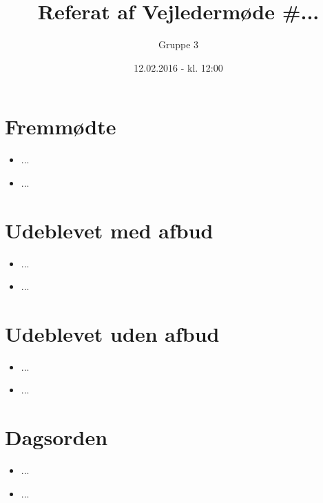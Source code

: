 \documentclass{article}
\title{Referat af Vejledermøde \#...}
\author{Gruppe 3}
\date{12.02.2016 - kl. 12:00}
\begin{document}
	\maketitle
	
	\section{Fremmødte}
	\begin{itemize}
		\item ...
		\item ...
	\end{itemize}
	
	\section{Udeblevet med afbud}
	\begin{itemize}
		\item ...
		\item ...
	\end{itemize}
	
	\section{Udeblevet uden afbud}
	\begin{itemize}
		\item ...
		\item ...
	\end{itemize}
	
	\section{Dagsorden}
	\begin{itemize}
		\item ...
		\item ...
	\end{itemize}
\end{document}
